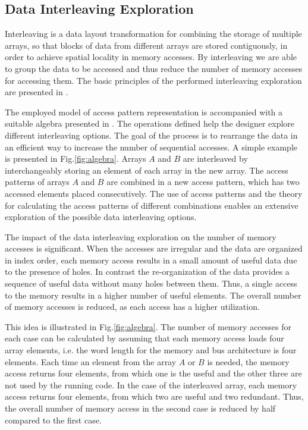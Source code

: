 \documentclass[prodmode,acmtecs]{acmsmall}
\begin{document}

\subsection{Data Interleaving Exploration}
Interleaving is a data layout transformation for combining the storage of multiple arrays, so that blocks of data from different arrays are stored contiguously, in order to achieve spatial locality in memory accesses.
By interleaving we are able to group the data to be accessed and thus reduce the number of memory accesses for accessing them.
The basic principles of the performed interleaving exploration are presented in \cite{sharma2013data}.

The employed model of access pattern representation is accompanied with a suitable algebra presented in \cite{kritikakou2013phd}.
The operations defined help the designer explore different interleaving options.
The goal of the process is to rearrange the data in an efficient way to increase the number of sequential accesses.
A simple example is presented in Fig.\ref{fig:algebra}.
Arrays $A$ and $B$ are interleaved by interchangeably storing an element of each array in the new array. 
The access patterns of arrays $A$ and $B$ are combined in a new access pattern, which has two accessed elements placed consecutively.
The use of access patterns and the theory for calculating the access patterns of different combinations enables an extensive exploration of the possible data interleaving options.

The impact of the data interleaving exploration on the number of memory accesses is significant.
When the accesses are irregular and the data are organized in index order, each memory access results in a small amount of useful data due to the presence of holes.
In contrast the re-organization of the data provides a sequence of useful data without many holes between them.
Thus, a single access to the memory results in a higher number of useful elements.
The overall number of memory accesses is reduced, as each access has a higher utilization.

This idea is illustrated in Fig.\ref{fig:algebra}.
The number of memory accesses for each case can be calculated by assuming that each memory access loads four array elements, i.e. the word length for the memory and bus architecture is four elements.
Each time an element from the array $A$ or $B$ is needed, the memory access returns four elements, from which one is the useful and the other three are not used by the running code.
In the case of the interleaved array, each memory access returns four elements, from which two are useful and two redundant.
Thus, the overall number of memory access in the second case is reduced by half compared to the first case.
\end{document}
